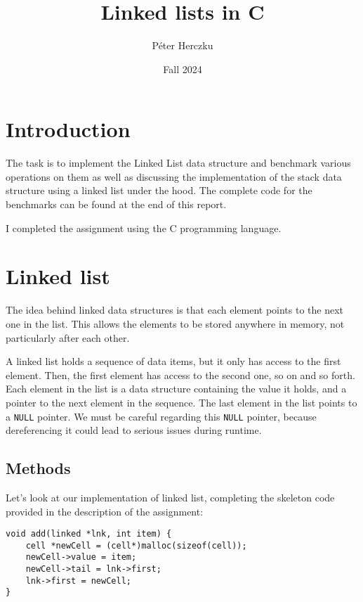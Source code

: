 \documentclass[a4paper,11pt]{article}
\begin{document}
    \title{
        \textbf{Linked lists in C}
    }
    \author{Péter Herczku}
    \date{Fall 2024}

    \maketitle

    \section*{Introduction}

    The task is to implement the Linked List data structure and benchmark various operations on them as well as discussing the implementation of the stack data structure using a linked list under the hood.
    The complete code for the benchmarks can be found at the end of this report.

    I completed the assignment using the C programming language.

    \section*{Linked list}

    The idea behind linked data structures is that each element points to the next one in the list.
    This allows the elements to be stored anywhere in memory, not particularly after each other.

    A linked list holds a sequence of data items, but it only has access to the first element.
    Then, the first element has access to the second one, so on and so forth.
    Each element in the list is a data structure containing the value it holds, and a pointer to the next element in the sequence.
    The last element in the list points to a {\tt NULL} pointer.
    We must be careful regarding this {\tt NULL} pointer, because dereferencing it could lead to serious issues during runtime.

    \subsection*{Methods}

    Let's look at our implementation of linked list, completing the skeleton code provided in the description of the assignment:

    \begin{verbatim}
void add(linked *lnk, int item) {
    cell *newCell = (cell*)malloc(sizeof(cell));
    newCell->value = item;
    newCell->tail = lnk->first;
    lnk->first = newCell;
}
    \end{verbatim}
\end{document}
